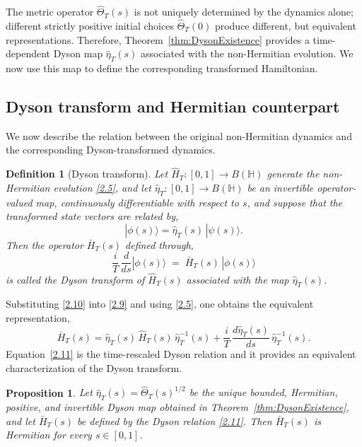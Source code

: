 \documentclass[pdflatex,sn-mathphys-num]{sn-jnl}
\theoremstyle{thmstyleone}
\newtheorem{proposition}[theorem]{Proposition}
\theoremstyle{thmstyletwo}
\theoremstyle{thmstylethree}
\newtheorem{definition}{Definition}
\begin{document}
The metric operator $\hat\Theta_T(s)$ is not uniquely determined by the dynamics alone;
different strictly positive initial choices $\hat\Theta_T(0)$ produce different, but
equivalent representations. Therefore, Theorem~\ref{thm:DysonExistence} provides a
time-dependent Dyson map $\hat\eta_T(s)$ associated with the non-Hermitian evolution.
We now use this map to define the corresponding transformed Hamiltonian.

\subsection{Dyson transform and Hermitian counterpart}

We now describe the relation between the original non-Hermitian dynamics and the
corresponding Dyson-transformed dynamics.

\begin{definition}[Dyson transform]
Let $\hat H_T : [0,1] \to B(\mathbb{H})$ generate the non-Hermitian evolution \eqref{2.5}, and let $\hat\eta_T : [0,1]\to B(\mathbb{H})$ be an invertible operator-valued map,
continuously differentiable with respect to $s$, and suppose that the transformed state
vectors are related by,
\begin{equation}\label{2.10}
 |\phi(s)\rangle=\hat\eta_T(s)\,|\psi(s)\rangle.
\end{equation}
Then the operator $\bar H_T(s)$ defined through,
\begin{equation}\label{2.9}
 \frac{i}{T}\,\frac{d}{ds}|\phi(s)\rangle \;=\; \bar H_T(s)\,|\phi(s)\rangle
\end{equation}
is called the \emph{Dyson transform} of $\hat H_T(s)$ associated with the map
$\hat\eta_T(s)$.
\end{definition}

Substituting \eqref{2.10} into \eqref{2.9} and using \eqref{2.5},
one obtains the equivalent representation,
\begin{equation}\label{2.11}
 \bar H_T(s)
 =
 \hat\eta_T(s)\,\hat H_T(s)\,\hat\eta_T^{-1}(s)
 +
 \frac{i}{T}\,\frac{d\hat\eta_T(s)}{ds}\,\hat\eta_T^{-1}(s).
\end{equation}
Equation~\eqref{2.11} is the time-rescaled Dyson relation and it provides an equivalent characterization of the Dyson transform.

\begin{proposition}\label{prop:Hbar-Hermitian}
Let $\hat\eta_T(s)=\hat\Theta_T(s)^{1/2}$ be the unique bounded, Hermitian, positive, and invertible Dyson map obtained in
Theorem~\ref{thm:DysonExistence}, and let $\bar H_T(s)$ be defined by the Dyson relation
\eqref{2.11}. Then $\bar H_T(s)$ is Hermitian for every $s\in[0,1]$.
\end{proposition}
\end{document}
